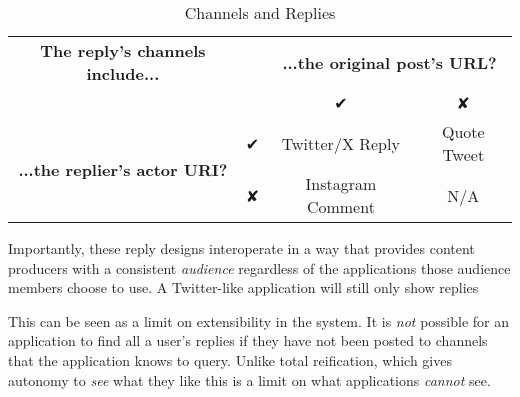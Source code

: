 \begin{table}[htbp]
    \label{concepts:channel-replies}
    \caption{Channels and Replies}
    \begin{tabular}{c|c|c|c}
        \textbf{The reply's channels include...} & & \multicolumn{2}{c}{\textbf{...the original post's URL?}} \\
        & & ✔︎ & ✘ \\
        \multirow{2}{*}{\textbf{...the replier's actor URI?}} & ✔︎ & Twitter/X Reply & Quote Tweet \\
        & ✘ & Instagram Comment & N/A \\
    \end{tabular}
\end{table}

Importantly, these reply designs interoperate in a way that provides content producers with
a consistent \emph{audience} regardless of the applications those audience members choose to use.
A Twitter-like application will still only show replies

This can be seen as a limit on extensibility in the system. It is \emph{not} possible for an
application to find all a user's replies if they have not been posted to channels that
the application knows to query.
Unlike total reification, which gives autonomy to \emph{see} what they like this is
a limit on what applications \emph{cannot} see.






